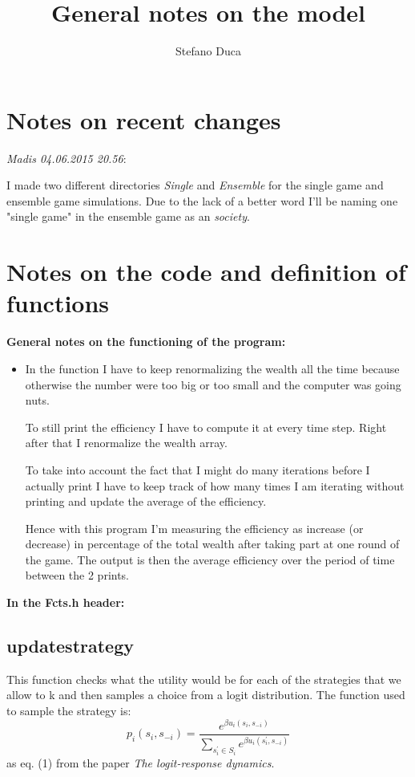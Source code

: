 \documentclass{article}
\author{Stefano Duca}
\title{General notes on the model}
\begin{document}
\maketitle

\section*{Notes on recent changes}

\emph{Madis 04.06.2015 20.56}:

I made two different directories \emph{Single} and \emph{Ensemble} for the single game and ensemble game simulations. Due to the lack of a better word I'll be naming one "single game" in the ensemble game as an \emph{society}. 
 

\section*{Notes on the code and definition of functions}
\textbf{General notes on the functioning of the program:}

\begin{itemize}

\item In the function I have to keep renormalizing the wealth all the time because otherwise the number were too big or too small and the computer was going nuts.

To still print the efficiency I have to compute it at every time step. Right after that I renormalize the wealth array.

To take into account the fact that I might do many iterations before I actually print I have to keep track of how many times I am iterating without printing and update the average of the efficiency.

Hence with this program I'm measuring the efficiency as increase (or decrease) in percentage of the total wealth after taking part at one round of the game.
The output is then the average efficiency over the period of time between the 2 prints.

\end{itemize}


\textbf{In the Fcts.h header:}

\subsection*{updatestrategy}
This function checks what the utility would be for each of the strategies that we allow to k and then samples a choice from a logit distribution.
The function used to sample the strategy is:
$$ p_{i}\left(s_{i},s_{-i}\right)=\frac{e^{\beta u_{i}\left(s_{i},s_{-i}\right)}}{\sum_{s_{i}^{'}\in S_{i}}e^{\beta u_{i}\left(s_{i}^{'},s_{-i}\right)}} $$
as eq. (1) from the paper \textit{The logit-response dynamics}.
\end{document}
